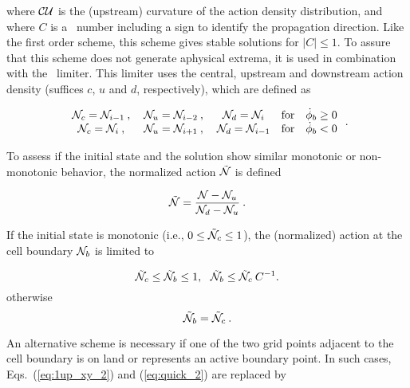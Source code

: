 \noindent
where $\cal CU$ is the (upstream) curvature of the action density
distribution, and where $C$ is a \cfl\ number including a sign to identify the
propagation direction. Like the first order scheme, this scheme gives stable
solutions for $|C| \leq 1$. To assure that this scheme does not generate
aphysical extrema, it is used in combination with the \ult\ limiter. This
limiter uses the central, upstream and downstream action density (suffices
$c$, $u$ and $d$, respectively), which are defined as


\begin{equation} \begin{array}{ccccc}
\cN_c = \cN_{i-1} \: , \: & \cN_u = \cN_{ i-2 } \: , \: &
                            \cN_d = \cN_{i} &
                            \mbox{for} & \dot{\phi}_b \geq 0 \\
\cN_c = \cN_{ i } \: , \: & \cN_u = \cN_{i+1} \: , \: &
                            \cN_d = \cN_{i-1} &
                            \mbox{for} & \dot{\phi}_b   <  0
\end{array} \: . \label{eq:ult_1} \end{equation}

\noindent
To assess if the initial state and the solution show similar monotonic or
non-monotonic behavior, the normalized action $\tilde{{\cal N}}$ is defined

\begin{equation}
\tilde\cN = \frac{\cN-\cN_u}{\cN_d - \cN_u} 
\: . \label{eq:ult_2} \end{equation}

\noindent
If the initial state is monotonic (i.e., $0 \leq \tilde{{\cal N}}_c \leq 1$), the
(normalized) action at the cell boundary ${\cal N}_b$ is limited to

\begin{equation}
\tilde\cN_c \leq \tilde\cN_b \leq 1 , \:\:\:
\tilde\cN_b \leq \tilde\cN_c \: C^{-1}  . 
\label{eq:ult_3} \end{equation}
\noindent otherwise \begin{equation}
\tilde\cN_b = \tilde\cN_c 
\: . \label{eq:ult_4} \end{equation}

\noindent
An alternative scheme is necessary if one of the two grid points adjacent to
the cell boundary is on land or represents an active boundary point. In such
cases, Eqs.~(\ref{eq:1up_xy_2}) and (\ref{eq:quick_2}) are replaced by

